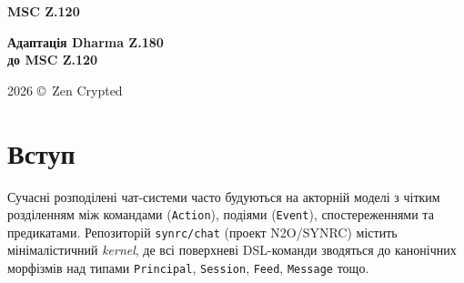 \documentclass{article}
\newcommand\HUGE[1]{\fontsize{40}{40}\selectfont #1}
\begin{document}
\pagestyle{fancy}

\begin{titlepage}
  \AddToShipoutPictureBG*{\AtPageLowerLeft{\color{nato}\rule{\paperwidth}{\paperheight}}}
  \color{white}\thispagestyle{empty}\vspace*{4cm}\centering
  {\Huge  \textbf{MSC Z.120} \par} \vspace{2cm}
  {\HUGE  \textbf{Адаптація Dharma Z.180 \\ до MSC Z.120} \par} \vspace{2.5cm}
  \vfill
  {\large 2026 \copyright\ Zen Crypted \par}
\end{titlepage}

\newpage

\tableofcontents

\vspace{3cm}


\begin{abstract}
У цьому документі проводиться аналіз мови опису архітектури ядра чат-системи з репозиторію \texttt{synrc/chat} (файл \texttt{ARCH-KERNEL-MAPPINGS.md}), яка базується на алгебраїчних типах, морфізмах та чіткому розділенні \texttt{Action}, \texttt{Event}, \texttt{Observation} та \texttt{Predicate}. 

Ми адаптуємо цю модель до стандартизованої нотації \textbf{Message Sequence Chart} (MSC) за рекомендацією ITU-T Z.120. Пропонується відповідність між елементами kernel (Principal, Session, Post, Mutate, Seen(EventObs(...)) тощо) та конструкціями MSC (instances, messages, actions, inline expressions alt/par/opt, conditions, HMSC). 

Така адаптація дозволяє візуально та формально описувати сценарії взаємодії в акторній моделі чату, роблячи її сумісною з традиційними методами формального опису телекомунікаційних систем. 

Ключові слова: Message Sequence Chart, Z.120, акторна модель, kernel mappings, чат-система, формальні методи.
\end{abstract}

\section{Вступ}

Сучасні розподілені чат-системи часто будуються на акторній моделі з чітким розділенням між командами (\texttt{Action}), подіями (\texttt{Event}), спостереженнями та предикатами. Репозиторій \texttt{synrc/chat} (проект N2O/SYNRC) містить мінімалістичний \textit{kernel}, де всі поверхневі DSL-команди зводяться до канонічних морфізмів над типами \texttt{Principal}, \texttt{Session}, \texttt{Feed}, \texttt{Message} тощо.
\end{document}
